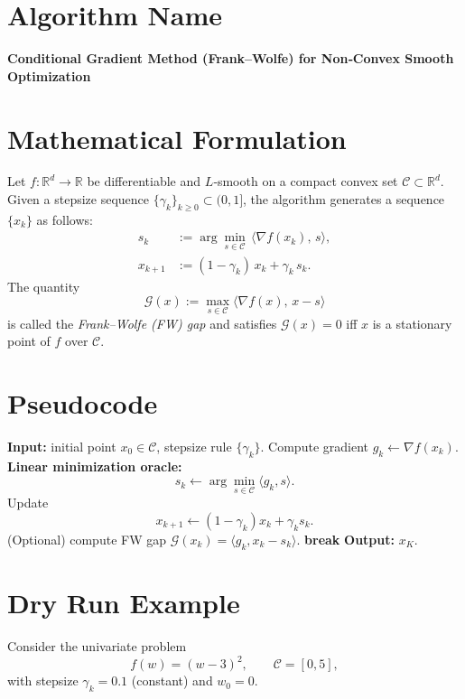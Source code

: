 \documentclass{article}
\newcommand{\grad}{\nabla}
\newcommand{\gap}{\mathcal{G}}
\newcommand{\R}{\mathbb{R}}
\newcommand{\dom}{\mathcal{C}}
\begin{document}
\section*{Algorithm Name}
\textbf{Conditional Gradient Method (Frank–Wolfe) for Non‑Convex Smooth Optimization}

\section*{Mathematical Formulation}
Let $f:\R^{d}\rightarrow\R$ be differentiable and $L$‑smooth on a compact convex set $\dom\subset\R^{d}$.  
Given a stepsize sequence $\{\gamma_{k}\}_{k\ge 0}\subset(0,1]$, the algorithm generates a sequence $\{x_{k}\}$ as follows:
\begin{align}
    s_{k} &:= \arg\min_{s\in\dom}\,\big\langle \grad f(x_{k}),\,s\big\rangle, \tag{1}\\[2mm]
    x_{k+1} &:= (1-\gamma_{k})\,x_{k}+\gamma_{k}\,s_{k}. \tag{2}
\end{align}
The quantity
\[
\gap(x):=\max_{s\in\dom}\big\langle \grad f(x),\,x-s\big\rangle
\]
is called the \emph{Frank–Wolfe (FW) gap} and satisfies $\gap(x)=0$ iff $x$ is a stationary point of $f$ over $\dom$.

\section*{Pseudocode}
\begin{algorithm}[H]
\caption{Frank–Wolfe for Non‑Convex Smooth $f$}
\begin{algorithmic}[1]
\STATE \textbf{Input:} initial point $x_{0}\in\dom$, stepsize rule $\{\gamma_{k}\}$.
    \STATE Compute gradient $g_{k}\gets \grad f(x_{k})$.
    \STATE \textbf{Linear minimization oracle:}
          \[
          s_{k}\gets\arg\min_{s\in\dom}\langle g_{k},s\rangle .
          \]
    \STATE Update 
          \[
          x_{k+1}\gets (1-\gamma_{k})x_{k}+\gamma_{k}s_{k}.
          \]
    \STATE (Optional) compute FW gap $\gap(x_{k})=\langle g_{k},x_{k}-s_{k}\rangle$.
        \STATE \textbf{break}
    \ENDIF
\ENDFOR
\STATE \textbf{Output:} $x_{K}$.
\end{algorithmic}
\end{algorithm}

\section*{Dry Run Example}
Consider the univariate problem
\[
f(w)=(w-3)^{2},\qquad \dom=[0,5],
\]
with stepsize $\gamma_{k}=0.1$ (constant) and $w_{0}=0$.
\end{document}
